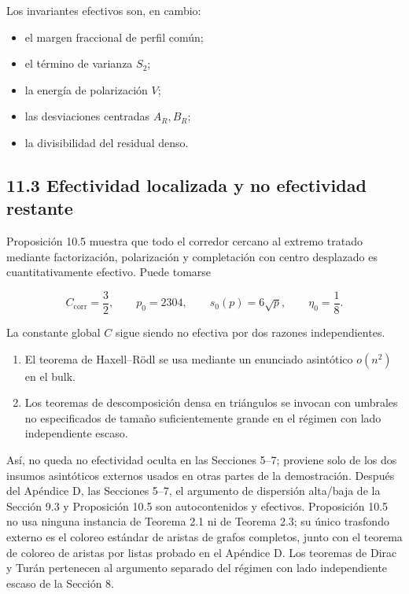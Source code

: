\documentclass[
  spanish,
  11pt,
  a4paper,
]{article}
\providecommand{\tightlist}{%
  \setlength{\itemsep}{0pt}\setlength{\parskip}{0pt}}
\begin{document}
Los invariantes efectivos son, en cambio:

\begin{itemize}
\tightlist
\item
  el margen fraccional de perfil común;
\item
  el término de varianza \(S_2\);
\item
  la energía de polarización \(V\);
\item
  las desviaciones centradas \(A_R,B_R\);
\item
  la divisibilidad del residual denso.
\end{itemize}

\subsection{11.3 Efectividad localizada y no efectividad restante}\label{efectividad-localizada-y-no-efectividad-restante}

Proposición 10.5 muestra que todo el corredor cercano al extremo tratado mediante factorización, polarización y completación con centro desplazado es cuantitativamente efectivo. Puede tomarse

\[
C_{\mathrm{corr}}=\frac32,
\qquad
p_0=2304,
\qquad
s_0(p)=6\sqrt p,
\qquad
\eta_0=\frac18.
\]

La constante global \(C\) sigue siendo no efectiva por dos razones independientes.

\begin{enumerate}
\def\labelenumi{\arabic{enumi}.}
\tightlist
\item
  El teorema de Haxell--Rödl se usa mediante un enunciado asintótico \(o(n^2)\) en el bulk.
\item
  Los teoremas de descomposición densa en triángulos se invocan con umbrales no especificados de tamaño suficientemente grande en el régimen con lado independiente escaso.
\end{enumerate}

Así, no queda no efectividad oculta en las Secciones 5--7; proviene solo de los dos insumos asintóticos externos usados en otras partes de la demostración. Después del Apéndice D, las Secciones 5--7, el argumento de dispersión alta/baja de la Sección 9.3 y Proposición 10.5 son autocontenidos y efectivos. Proposición 10.5 no usa ninguna instancia de Teorema 2.1 ni de Teorema 2.3; su único trasfondo externo es el coloreo estándar de aristas de grafos completos, junto con el teorema de coloreo de aristas por listas probado en el Apéndice D. Los teoremas de Dirac y Turán pertenecen al argumento separado del régimen con lado independiente escaso de la Sección 8.
\end{document}
